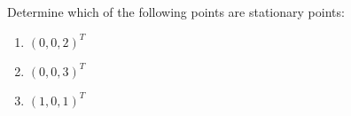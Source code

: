 Determine which of the following points are stationary points:

\begin{enumerate}
    \item $(0, 0, 2)^T$
    \item $(0, 0, 3)^T$
    \item $(1, 0, 1)^T$
\end{enumerate}

\begin{solution}
    \ \\
    \vfill
\end{solution}